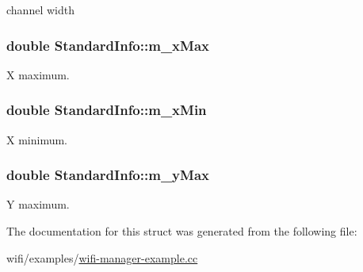 channel width 

\subsubsection[{\texorpdfstring{m\+\_\+x\+Max}{m_xMax}}]{\setlength{\rightskip}{0pt plus 5cm}double Standard\+Info\+::m\+\_\+x\+Max}\hypertarget{structStandardInfo_a9273620f117082177fb82865c3372e41}{}\label{structStandardInfo_a9273620f117082177fb82865c3372e41}


X maximum. 

\subsubsection[{\texorpdfstring{m\+\_\+x\+Min}{m_xMin}}]{\setlength{\rightskip}{0pt plus 5cm}double Standard\+Info\+::m\+\_\+x\+Min}\hypertarget{structStandardInfo_af07b86a8ed5fc63871218325776c77e1}{}\label{structStandardInfo_af07b86a8ed5fc63871218325776c77e1}


X minimum. 

\subsubsection[{\texorpdfstring{m\+\_\+y\+Max}{m_yMax}}]{\setlength{\rightskip}{0pt plus 5cm}double Standard\+Info\+::m\+\_\+y\+Max}\hypertarget{structStandardInfo_a7037180b40be174fdb983b9c92084a1f}{}\label{structStandardInfo_a7037180b40be174fdb983b9c92084a1f}


Y maximum. 



The documentation for this struct was generated from the following file\+:\begin{DoxyCompactItemize}
\item 
wifi/examples/\hyperlink{wifi-manager-example_8cc}{wifi-\/manager-\/example.\+cc}\end{DoxyCompactItemize}
